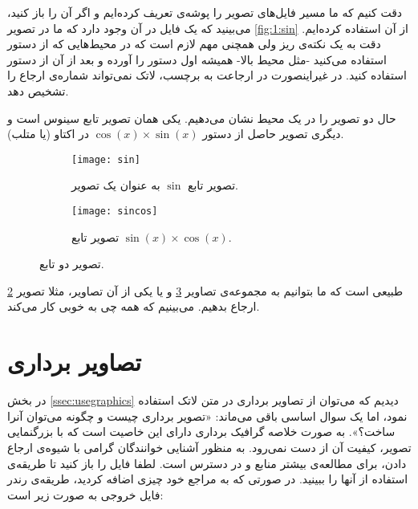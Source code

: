 دقت کنیم که ما مسیر فایل‌های تصویر را پوشه‌ی  تعریف کرده‌ایم و اگر آن را باز کنید، می‌بینید که یک فایل  در آن وجود دارد که ما در تصویر \ref{fig:1:sin} از آن استفاده کرده‌ایم. دقت به یک نکته‌ی ریز ولی همچنی مهم لازم است که در محیط‌هایی که از دستور  استفاده می‌کنید -مثل محیط بالا- همیشه اول دستور  را آورده و بعد از آن از دستور  استفاده کنید. در غیراینصورت در ارجاعت به برچسب، لاتک نمی‌تواند شماره‌ی ارجاع را تشخیص دهد.

حال دو تصویر را در یک محیط نشان می‌دهیم. یکی همان تصویر تابع سینوس است و دیگری تصویر حاصل از دستور $\cos(x)\times\sin(x)$ در اکتاو (یا متلب).

\begin{figure}[h]
\centering
\begin{subfigure}[b]{.45\textwidth}
	\texttt{[image: sin]}
	\caption{تصویر تابع $\sin$ به عنوان یک تصویر.}
	\label{fig:1:sin_subfig}
\end{subfigure}
\begin{subfigure}[b]{.45\textwidth}
	\texttt{[image: sincos]}
	\caption{تصویر تابع $\sin(x)\times\cos(x)$.}
	\label{fig:1:sincos_subfig}
\end{subfigure}
\caption{تصویر دو تابع.}
\label{fig:1:anotherfig}
\end{figure}

طبیعی است که ما بتوانیم به مجموعه‌ی تصاویر \ref{fig:1:anotherfig} و یا یکی از آن تصاویر، مثلا تصویر \ref{fig:1:sincos_subfig} ارجاع بدهیم. می‌بینیم که همه چی به خوبی کار می‌کند.

\section{تصاویر برداری}
در بخش \ref{ssec:usegraphics} دیدیم که می‌توان از تصاویر برداری در متن لاتک استفاده نمود، اما یک سوال اساسی باقی می‌ماند: «تصویر برداری چیست و چگونه می‌توان آنرا ساخت؟». به صورت خلاصه گرافیک برداری دارای این خاصیت است که با بزرگنمایی تصویر، کیفیت آن از دست نمی‌رود. به منظور آشنایی خوانندگان گرامی با شیوه‌ی ارجاع دادن، برای مطالعه‌ی بیشتر منابع \cite{wiki:vecGraphFa} و \cite{wiki:vecGraphEn} در دسترس است. لطفا فایل  را باز کنید تا طریقه‌ی استفاده از آنها را ببینید. در صورتی که به مراجع خود چیزی اضافه کردید، طریقه‌ی رندر فایل خروجی به صورت زیر است:

\begin{latin}

\end{latin}

